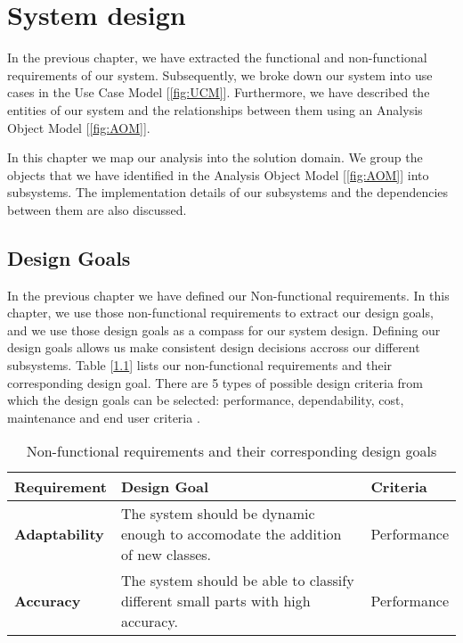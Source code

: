 \chapter{System design}

In the previous chapter, we have extracted the functional and non-functional requirements of our system. Subsequently, we broke down our system into use cases in the Use Case Model [\ref{fig:UCM}]. Furthermore, we have described the entities of our system and the relationships between them using an Analysis Object Model [\ref{fig:AOM}].

In this chapter we map our analysis into the solution domain. We group the objects that we have identified in the Analysis Object Model [\ref{fig:AOM}] into subsystems. The implementation details of our subsystems and the dependencies between them are also discussed.

\section{Design Goals}

In the previous chapter we have defined our Non-functional requirements. In this chapter, we use those non-functional requirements to extract our design goals, and we use those design goals as a compass for our system design. Defining our design goals allows us make consistent design decisions accross our different subsystems. Table [\ref{tab:DG}] lists our non-functional requirements and their corresponding design goal. There are 5 types of possible design criteria from which the design goals can be selected: performance, dependability, cost, maintenance and end user criteria \cite{bruegge2004object}.

\begin{table}
  \centering
  \begin{tabular}{ | l | p{5cm} | l | }
    \hline
    \textbf{Requirement} & \textbf{Design Goal} & \textbf{Criteria} \\ \hline
    \textbf{Adaptability} & The system should be dynamic enough to accomodate the addition of new classes. & Performance \\ \hline
    \textbf{Accuracy} & The system should be able to classify different small parts with high accuracy. & Performance \\ \hline
  \end{tabular}
  \caption{Non-functional requirements and their corresponding design goals}
  \label{tab:DG}
\end{table}

